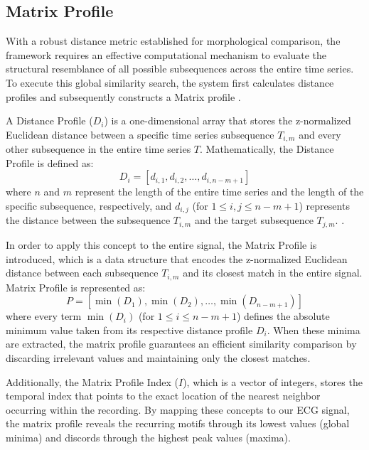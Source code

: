 \documentclass[conference,10pt]{IEEEtran}
\begin{document}
\subsection{Matrix Profile}
With a robust distance metric established for morphological comparison, the framework requires an effective computational mechanism to evaluate the structural resemblance of all possible subsequences across the entire time series. To execute this global similarity search, the system first calculates distance profiles and subsequently constructs a Matrix profile \cite{r7}. 

A Distance Profile ($D_i$) is a one-dimensional array that stores the z-normalized Euclidean distance between a specific time series subsequence $T_{i,m}$ and every other subsequence in the entire time series $T$. 
Mathematically, the Distance Profile is defined as:
\begin{equation}
    D_i = [d_{i,1}, d_{i,2}, \dots, d_{i,n-m+1}]
\end{equation}
where $n$ and $m$ represent the length of the entire time series and the length of the specific subsequence, respectively, and $d_{i,j}$ (for $1 \le i, j \le n-m+1$)   represents the distance between the subsequence $T_{i,m}$ and the target subsequence $T_{j,m}$. \cite{r7}. 

In order to apply this concept to the entire signal, the Matrix Profile \cite{r7} is introduced, which is a data structure that encodes the z-normalized Euclidean distance between each subsequence $T_{i,m}$ and its closest match in the entire signal. Matrix Profile is represented as:
\begin{equation}
    P = [\min(D_1), \min(D_2), \dots, \min(D_{n-m+1})]
\end{equation}
where every term $\min(D_i)$ (for $1 \le i \le n-m+1$) defines the absolute minimum value taken from its respective distance profile $D_i$. When these minima are extracted, the matrix profile guarantees an efficient similarity comparison by discarding irrelevant values and maintaining only the closest matches. 

Additionally, the Matrix Profile Index ($I$), which is a vector of integers, stores the temporal index that points to the exact location of the nearest neighbor occurring within the recording. 
By mapping these concepts to our ECG signal, the matrix profile reveals the recurring motifs through its lowest values (global minima) and discords through the highest peak values (maxima).
\end{document}

